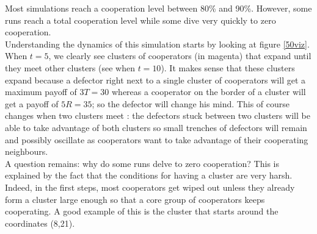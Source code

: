 \documentclass[a4paper]{article}
\begin{document}
Most simulations reach a cooperation level between 80\% and 90\%. However, some
runs reach a total cooperation level while some dive very quickly to zero
cooperation.\\

Understanding the dynamics of this simulation starts by looking at figure
\ref{50viz}. When $t=5$, we clearly see clusters of cooperators (in magenta)
that expand until they meet other clusters (see when $t=10$). It makes sense
that these clusters expand because a defector right next to a single cluster
of cooperators will get a maximum payoff of $3T=30$ whereas a cooperator on 
the border of a cluster will get a payoff of $5R=35$; so the defector will
change his mind. This of course changes when two clusters meet : the defectors
stuck between two clusters will be able to take advantage of both clusters so
small trenches of defectors will remain and possibly oscillate as cooperators
want to take advantage of their cooperating neighbours.\\

A question remains: why do some runs delve to zero cooperation? This is
explained by the fact that the conditions for having a cluster are very harsh.
Indeed, in the first steps, most cooperators get wiped out unless they already
form a cluster large enough so that a core group of cooperators keeps
cooperating. A good example of this is the cluster that starts around the
coordinates (8,21).\\
\end{document}
